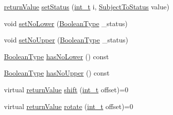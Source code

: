 \begin{DoxyCompactItemize}
\item 
\hyperlink{_message_handling_8hpp_a81d556f613bfbabd0b1f9488c0fa865e}{return\+Value} \hyperlink{class_subject_to_a3d444fcbc29b6ae083e2b360706bb248}{set\+Status} (\hyperlink{_types_8hpp_ab6fd6105e64ed14a0c9281326f05e623}{int\+\_\+t} i, \hyperlink{_types_8hpp_a70a6a40d261a015ead8d43aa589383a4}{Subject\+To\+Status} value)
\item 
void \hyperlink{class_subject_to_a5c83994df77ef2ef2b8f2bace9ff8a83}{set\+No\+Lower} (\hyperlink{_types_8hpp_a20f82124c82b6f5686a7fce454ef9089}{Boolean\+Type} \+\_\+status)
\item 
void \hyperlink{class_subject_to_a3cb48f0d24fc5cdd11697465c5b46f13}{set\+No\+Upper} (\hyperlink{_types_8hpp_a20f82124c82b6f5686a7fce454ef9089}{Boolean\+Type} \+\_\+status)
\item 
\hyperlink{_types_8hpp_a20f82124c82b6f5686a7fce454ef9089}{Boolean\+Type} \hyperlink{class_subject_to_a6e11c242c3792483b438473c813ec323}{has\+No\+Lower} () const
\item 
\hyperlink{_types_8hpp_a20f82124c82b6f5686a7fce454ef9089}{Boolean\+Type} \hyperlink{class_subject_to_a89f1aefda7a58a2a040ba7b4d030c821}{has\+No\+Upper} () const
\item 
virtual \hyperlink{_message_handling_8hpp_a81d556f613bfbabd0b1f9488c0fa865e}{return\+Value} \hyperlink{class_subject_to_af584328614003c2b9e92b185c6ceedc9}{shift} (\hyperlink{_types_8hpp_ab6fd6105e64ed14a0c9281326f05e623}{int\+\_\+t} offset)=0
\item 
virtual \hyperlink{_message_handling_8hpp_a81d556f613bfbabd0b1f9488c0fa865e}{return\+Value} \hyperlink{class_subject_to_a6e3b466f01422cc7361e7a8d1f007aa6}{rotate} (\hyperlink{_types_8hpp_ab6fd6105e64ed14a0c9281326f05e623}{int\+\_\+t} offset)=0
\end{DoxyCompactItemize}
